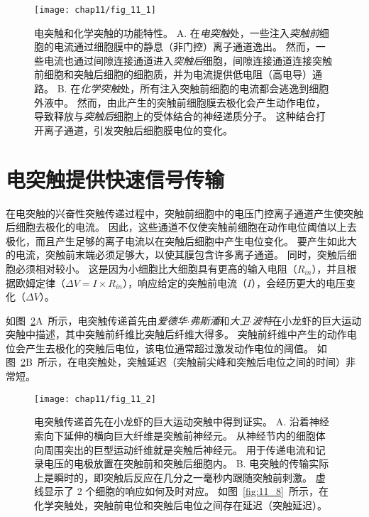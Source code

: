 \begin{figure}[htbp]
	\centering
	\texttt{[image: chap11/fig\_11\_1]}
	\caption{电突触和化学突触的功能特性。
		A. 在\textit{电突触}处，一些注入\textit{突触前}细胞的电流通过细胞膜中的静息（非门控）离子通道逸出。
		然而，一些电流也通过间隙连接通道进入\textit{突触后}细胞，间隙连接通道连接突触前细胞和突触后细胞的细胞质，并为电流提供低电阻（高电导）通路。
		B. 在\textit{化学突触}处，所有注入突触前细胞的电流都会逃逸到细胞外液中。
		然而，由此产生的突触前细胞膜去极化会产生动作电位，导致释放与\textit{突触后}细胞上的受体结合的神经递质分子。
		这种结合打开离子通道，引发突触后细胞膜电位的变化。}
	\label{fig:11_1}
\end{figure}


\section{电突触提供快速信号传输}

在电突触的兴奋性突触传递过程中，突触前细胞中的电压门控离子通道产生使突触后细胞去极化的电流。
因此，这些通道不仅使突触前细胞在动作电位阈值以上去极化，而且产生足够的离子电流以在突触后细胞中产生电位变化。
要产生如此大的电流，突触前末端必须足够大，以使其膜包含许多离子通道。
同时，突触后细胞必须相对较小。
这是因为小细胞比大细胞具有更高的输入电阻（$R_{in}$），并且根据欧姆定律（$\Delta V = I \times R_{in}$），响应给定的突触前电流（$I$），会经历更大的电压变化（$\Delta V$）。


如图~\ref{fig:11_2}A~所示，电突触传递首先由\textit{爱德华$\cdot$弗斯潘}和\textit{大卫$\cdot$波特}在小龙虾的巨大运动突触中描述，其中突触前纤维比突触后纤维大得多。
突触前纤维中产生的动作电位会产生去极化的突触后电位，该电位通常超过激发动作电位的阈值。
如图~\ref{fig:11_2}B~所示，在电突触处，突触延迟（突触前尖峰和突触后电位之间的时间）非常短。


\begin{figure}[htbp]
	\centering
	\texttt{[image: chap11/fig\_11\_2]}
	\caption{电突触传递首先在小龙虾的巨大运动突触中得到证实\cite{furshpan1959transmission,furshpan1957mechanism}。 
		A. 沿着神经索向下延伸的横向巨大纤维是突触前神经元。
		从神经节内的细胞体向周围突出的巨型运动纤维就是突触后神经元。
		用于传递电流和记录电压的电极放置在突触前和突触后细胞内。
		B. 电突触的传输实际上是瞬时的，即突触后反应在几分之一毫秒内跟随突触前刺激。
		虚线显示了 2 个细胞的响应如何及时对应。
		如图~\ref{fig:11_8}~所示，在化学突触处，突触前电位和突触后电位之间存在延迟（突触延迟）。}
	\label{fig:11_2}
\end{figure}


